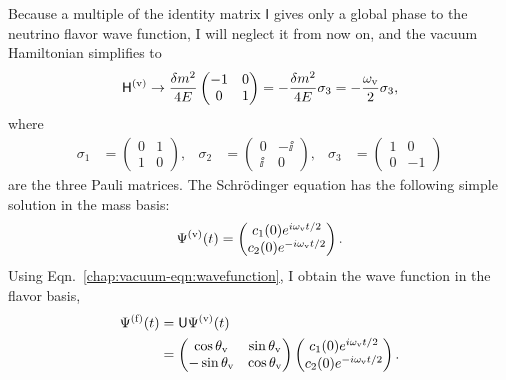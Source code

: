 Because a multiple of the identity matrix $\mathsf{I}$ gives only a global phase to the neutrino flavor wave function, I will neglect it from now on, and the vacuum Hamiltonian simplifies to
\begin{equation}
\mathsf H^{(\mathrm v)} \to  \frac{\delta m^2}{4E} \begin{pmatrix}
-1 & 0 \\
0 & 1
\end{pmatrix} = -\frac{\delta m^2}{4E} \sigma_3 = -\frac{\omega_{\mathrm v}}{2}\sigma_3,
\end{equation}
where
\begin{align}
\sigma_1 &=  \begin{pmatrix}
0 & 1 \\
1 & 0
\end{pmatrix}, &\sigma_2 &=  \begin{pmatrix}
0 & -\ii \\
\ii & 0
\end{pmatrix},  &\sigma_3 &=  \begin{pmatrix}
1 & 0 \\
0 & -1
\end{pmatrix}
\end{align}
are the three Pauli matrices.
The Schr\"{o}dinger equation has the following simple solution in the mass basis:
\begin{equation}
\Psi^{(\mathrm v)}(t) = \begin{pmatrix}
c_1(0) e^{i \omega_\mathrm v t/2 } \\
c_2(0) e^{ -i\omega_\mathrm v t/2 }
\end{pmatrix}.
\end{equation}
Using Eqn.~\eqref{chap:vacuum-eqn:wavefunction}, I obtain the wave function in the flavor basis,
\begin{align}
\Psi^{(\ff)}(t) &= \mathsf{U}\Psi^{(\vv)}(t) \\
& = \begin{pmatrix} \cos\theta_\vv & \sin \theta_\vv \\ -\sin \theta_\vv & \cos \theta_\vv \end{pmatrix} \begin{pmatrix} c_1(0) e^{i\omega_\vv t/2 } \\
c_2(0) e^{ -i\omega_\vv t/2 }    \end{pmatrix} .
\label{chap:vacuum-eqn:wavefuncion-time}
\end{align}
